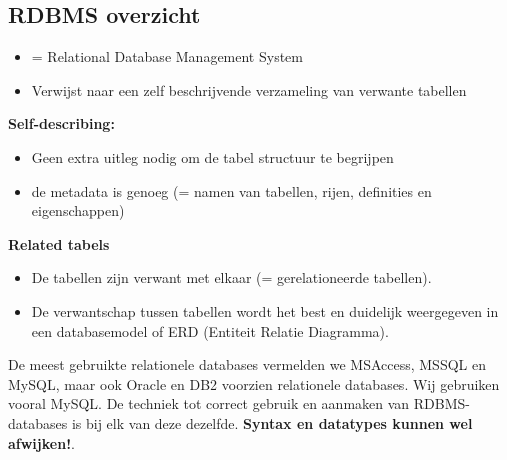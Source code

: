 \documentclass{article}
\newcommand{\bold}[1]{\textbf{#1}}
\begin{document}
\subsection{RDBMS overzicht}
\begin{itemize}
    \item = Relational Database Management System
    \item Verwijst naar een zelf beschrijvende verzameling van verwante tabellen
\end{itemize}

\bold{Self-describing:}
\begin{itemize}
    \item Geen extra uitleg nodig om de tabel structuur te begrijpen
    \item de metadata is genoeg (= namen van tabellen, rijen, definities en eigenschappen)
\end{itemize}

\bold{Related tabels}
\begin{itemize}
    \item De tabellen zijn verwant met elkaar (= gerelationeerde tabellen). 
    \item De verwantschap tussen tabellen wordt het best en duidelijk weergegeven in een databasemodel of ERD (Entiteit Relatie Diagramma).
\end{itemize}


De meest gebruikte relationele databases vermelden we MSAccess, MSSQL en MySQL, maar ook Oracle en DB2 voorzien relationele databases. Wij gebruiken vooral MySQL.
De techniek tot correct gebruik en aanmaken van RDBMS-databases is bij elk van deze dezelfde. \bold{Syntax en datatypes kunnen wel afwijken!}.
\end{document}
